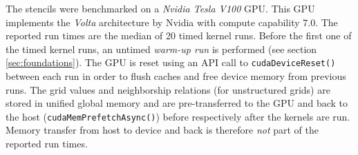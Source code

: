 The stencils were benchmarked on a \emph{Nvidia Tesla V100} GPU. This GPU implements the \emph{Volta} architecture by Nvidia with compute capability $7.0$. The reported run times are the median of 20 timed kernel runs. Before the first one of the timed kernel runs, an untimed \emph{warm-up run} is performed (see section \ref{sec:foundations}). The GPU is reset using an API call to \texttt{cudaDeviceReset()} between each run in order to flush caches and free device memory from previous runs. The grid values and neighborship relations (for unstructured grids) are stored in unified global memory and are pre-transferred to the GPU and back to the host (\texttt{cudaMemPrefetchAsync()}) before respectively after the kernels are run. Memory transfer from host to device and back is therefore \emph{not} part of the reported run times.